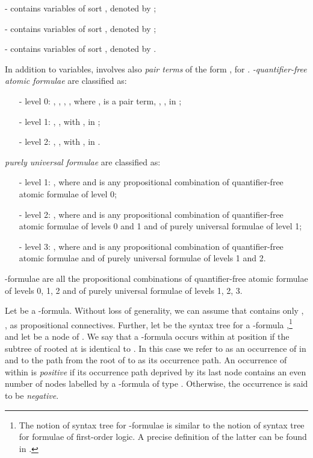 \documentclass[a4paper]{llncs}
\begin{document}
{-  contains variables of sort , denoted by ; }

{-   contains variables of sort , denoted by ;}

{-  contains variables of sort , denoted by  .}

\medskip
\noindent
In addition to variables,  involves also \emph{pair terms} of the form , for .
\emph{-quantifier-free atomic formulae} are classified as:
\begin{itemize}
\item[-] {level 0: , , , , where ,  is a pair term, , ,  in ;}
\item[-] {level 1: , , with ,  in ;}
\item[-] {level 2: , , with ,  in .}
\end{itemize}

\noindent  \emph{purely universal formulae} are classified as:

\begin{itemize}
\item[-] { level 1: , where    and  is any propositional combination of quantifier-free atomic formulae of level 0;}
\item[-] { level 2: , where    and  is any propositional combination of quantifier-free atomic formulae of levels 0 and 1 and of purely universal formulae of level 1;}
\item[-] {level 3: , where    and  is any propositional combination of quantifier-free atomic formulae and of purely universal formulae of levels 1 and 2.}
\end{itemize}

\noindent
-formulae are all the propositional combinations of quantifier-free atomic formulae of levels 0, 1, 2 and of purely universal formulae of levels 1, 2, 3.

Let  be a -formula. Without loss of generality, we can assume that  contains only , ,  as propositional connectives. Further, let  be the syntax tree for a -formula ,\footnote{The notion of syntax tree for -formulae is similar to the notion of syntax tree for formulae of first-order logic. A precise definition of the latter can be found in \cite{DeJo90}.} and let  be a node of . We say that a -formula  occurs within  at position  if the subtree of  rooted at 
is identical to . In this case we refer to  as an occurrence of  in  and to the path from the root
of  to  as its occurrence path. An occurrence of  within  is
\emph{positive} if its occurrence path deprived by its last node contains an even number of nodes labelled by a -formula of type . Otherwise, the occurrence is said to be \emph{negative}.
\end{document}
